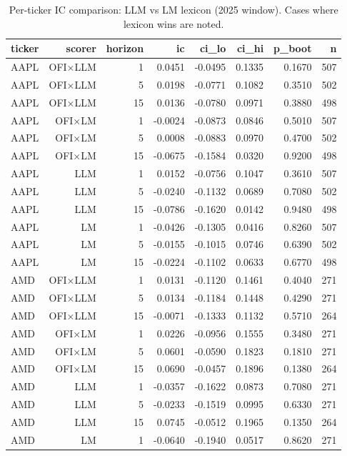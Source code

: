 \begin{table}[htbp]
\centering
\caption{Per-ticker IC comparison: LLM vs LM lexicon (2025 window). Cases where lexicon wins are noted.}
\label{tab:agent_vs_lexicon}
\begin{tabular}{lrrrrrrr}
\toprule
ticker & scorer & horizon & ic & ci\_lo & ci\_hi & p\_boot & n \\
\midrule
AAPL & OFI×LLM & 1 & 0.0451 & -0.0495 & 0.1335 & 0.1670 & 507 \\
AAPL & OFI×LLM & 5 & 0.0198 & -0.0771 & 0.1082 & 0.3510 & 502 \\
AAPL & OFI×LLM & 15 & 0.0136 & -0.0780 & 0.0971 & 0.3880 & 498 \\
AAPL & OFI×LM & 1 & -0.0024 & -0.0873 & 0.0846 & 0.5010 & 507 \\
AAPL & OFI×LM & 5 & 0.0008 & -0.0883 & 0.0970 & 0.4700 & 502 \\
AAPL & OFI×LM & 15 & -0.0675 & -0.1584 & 0.0320 & 0.9200 & 498 \\
AAPL & LLM & 1 & 0.0152 & -0.0756 & 0.1047 & 0.3610 & 507 \\
AAPL & LLM & 5 & -0.0240 & -0.1132 & 0.0689 & 0.7080 & 502 \\
AAPL & LLM & 15 & -0.0786 & -0.1620 & 0.0142 & 0.9480 & 498 \\
AAPL & LM & 1 & -0.0426 & -0.1305 & 0.0416 & 0.8260 & 507 \\
AAPL & LM & 5 & -0.0155 & -0.1015 & 0.0746 & 0.6390 & 502 \\
AAPL & LM & 15 & -0.0224 & -0.1102 & 0.0633 & 0.6770 & 498 \\
AMD & OFI×LLM & 1 & 0.0131 & -0.1120 & 0.1461 & 0.4040 & 271 \\
AMD & OFI×LLM & 5 & 0.0134 & -0.1184 & 0.1448 & 0.4290 & 271 \\
AMD & OFI×LLM & 15 & -0.0071 & -0.1333 & 0.1132 & 0.5710 & 264 \\
AMD & OFI×LM & 1 & 0.0226 & -0.0956 & 0.1555 & 0.3480 & 271 \\
AMD & OFI×LM & 5 & 0.0601 & -0.0590 & 0.1823 & 0.1810 & 271 \\
AMD & OFI×LM & 15 & 0.0690 & -0.0457 & 0.1896 & 0.1380 & 264 \\
AMD & LLM & 1 & -0.0357 & -0.1622 & 0.0873 & 0.7080 & 271 \\
AMD & LLM & 5 & -0.0233 & -0.1519 & 0.0995 & 0.6330 & 271 \\
AMD & LLM & 15 & 0.0745 & -0.0512 & 0.1965 & 0.1350 & 264 \\
AMD & LM & 1 & -0.0640 & -0.1940 & 0.0517 & 0.8620 & 271 \\

\end{tabular}
\end{table}
